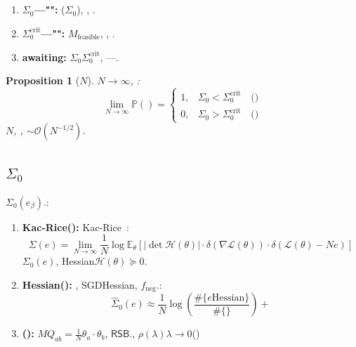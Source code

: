 \documentclass[12pt,a4paper]{article}
\newtheorem{proposition}[theorem]{Proposition}
\theoremstyle{remark}
\newcommand{\E}{\mathbb{E}}
\newcommand{\Pbb}{\mathbb{P}}
\newcommand{\loss}{\mathcal{L}}
\newcommand{\RSB}{\textsf{RSB}}
\begin{document}
\subsection{}
\begin{enumerate}[label=(\arabic*),itemsep=3pt]
    \item \textbf{$\Sigma_0$---"": } ($\Sigma_0$), , .
    \item \textbf{$\Sigma_0^{\text{crit}}$---"": } $M_{\text{feasible}}$, , .
    \item \textbf{awaiting: } $\Sigma_0$$\Sigma_0^{\text{crit}}$, ---.
\end{enumerate}
\begin{proposition}[$N$]\label{prop:large_N}
$N \to \infty$, : 
\begin{equation}
    \lim_{N \to \infty} \Pbb(\text{}) = \begin{cases}
        1, & \Sigma_0 < \Sigma_0^{\text{crit}} \quad \text{()} \\
        0, & \Sigma_0 > \Sigma_0^{\text{crit}} \quad \text{()}
    \end{cases}
\end{equation}
$N$, , $\sim \mathcal{O}(N^{-1/2})$.
\end{proposition}
\subsection{$\Sigma_0$}
$\Sigma_0(e_\beta)$.: 
\begin{enumerate}[label=\textbf{ \arabic*},leftmargin=*,itemsep=4pt]
    \item \textbf{Kac-Rice(): } Kac-Rice~\cite{fyodorov2004}: 
    \begin{equation}\label{eq:kac_rice}
        \Sigma(e) = \lim_{N\to\infty} \frac{1}{N} \log \E_\theta\left[|\det \mathcal{H}(\theta)| \cdot \delta(\nabla \loss(\theta)) \cdot \delta(\loss(\theta) - N e)\right]
    \end{equation}
    $\Sigma_0(e)$, Hessian$\mathcal{H}(\theta) \succeq 0$.
    \item \textbf{Hessian(): } , SGDHessian, 
    $f_{\text{neg}}$.: 
    \begin{equation}
        \hat{\Sigma}_0(e) \approx \frac{1}{N} \log \left(\frac{\#\{\text{}e\text{Hessian}\}}{\#\{\text{}\}}\right) + \text{}
    \end{equation}
    \item \textbf{(): } $M$$Q_{ab} = \frac{1}{N}\theta_a \cdot \theta_b$, 
    $\RSB$., $\rho(\lambda)$$\lambda \to 0$()
\end{enumerate}
\end{document}
